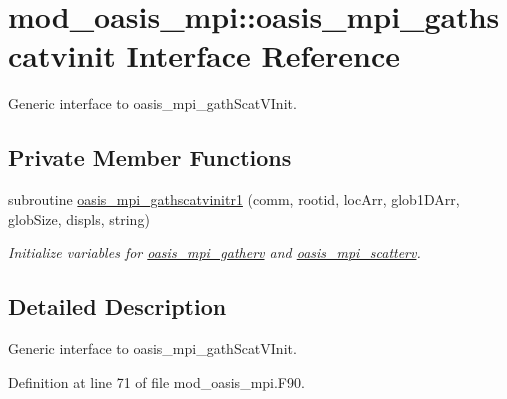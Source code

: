 \hypertarget{interfacemod__oasis__mpi_1_1oasis__mpi__gathscatvinit}{\section{mod\+\_\+oasis\+\_\+mpi\+:\+:oasis\+\_\+mpi\+\_\+gathscatvinit Interface Reference}
\label{interfacemod__oasis__mpi_1_1oasis__mpi__gathscatvinit}
}


Generic interface to oasis\+\_\+mpi\+\_\+gath\+Scat\+V\+Init.  


\subsection*{Private Member Functions}
\begin{DoxyCompactItemize}
\item 
subroutine \hyperlink{interfacemod__oasis__mpi_1_1oasis__mpi__gathscatvinit_a15fc3df477e1fa561fcee17ed718bff8}{oasis\+\_\+mpi\+\_\+gathscatvinitr1} (comm, rootid, loc\+Arr, glob1\+D\+Arr, glob\+Size, displs, string)
\begin{DoxyCompactList}\small\item\em Initialize variables for \hyperlink{interfacemod__oasis__mpi_1_1oasis__mpi__gatherv}{oasis\+\_\+mpi\+\_\+gatherv} and \hyperlink{interfacemod__oasis__mpi_1_1oasis__mpi__scatterv}{oasis\+\_\+mpi\+\_\+scatterv}. \end{DoxyCompactList}\end{DoxyCompactItemize}


\subsection{Detailed Description}
Generic interface to oasis\+\_\+mpi\+\_\+gath\+Scat\+V\+Init. 

Definition at line 71 of file mod\+\_\+oasis\+\_\+mpi.\+F90.



